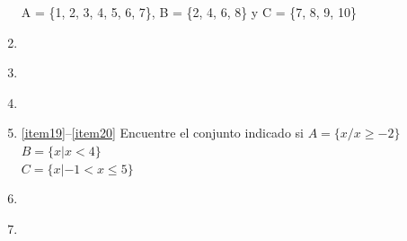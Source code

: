 \documentclass[10pt,twoside]{article}
\begin{document}
\begin{enumerate}
A = \{1, 2, 3, 4, 5, 6, 7\}, \quad B = \{2, 4, 6, 8\} \quad y \quad C = \{7, 8, 9, 10\}
\item \label{item17}
\begin{enumerate}
\end{enumerate}
\item 
\begin{enumerate}
\end{enumerate}
\item
\begin{enumerate}
\end{enumerate}
\item \label{item18}
\begin{enumerate}
\end{enumerate}
\ref{item19}--\ref{item20} Encuentre el conjunto indicado si \quad $A=\{x/x\geq-2\}$ \quad $B=\{x|x<4\}$ \\ $C=\{x|-1<x\leq 5\}$
 \newpage
 \item \label{item19}
 \begin{enumerate}
 \end{enumerate}
 \item \label{item20}
 \begin{enumerate}

\end{enumerate}
\end{enumerate}
\end{document}
